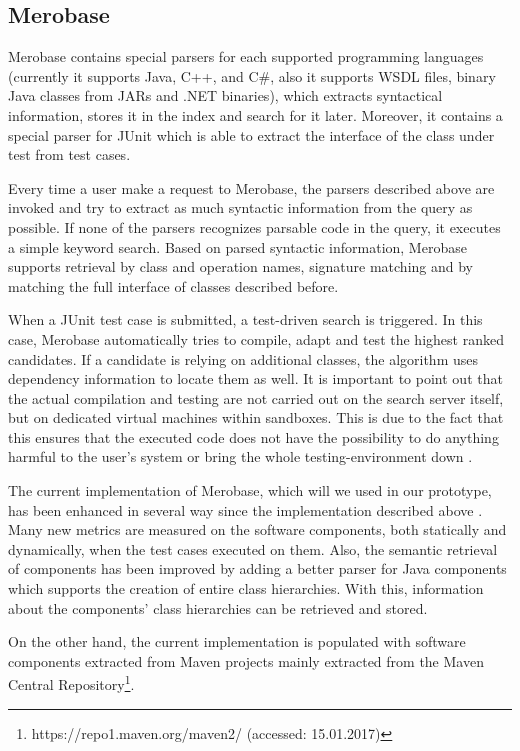 \subsection{Merobase}
\label{subsec:merobase}

Merobase contains special parsers for each supported programming languages (currently it supports Java, C++, and C\#, also it supports WSDL files, binary Java classes from JARs and .NET binaries), which extracts syntactical information, stores it in the index and search for it later. Moreover, it contains a special parser for JUnit which is able to extract the interface of the class under test from test cases.

Every time a user make a request to Merobase, the parsers described above are invoked and try to extract as much syntactic information from the query as possible. If none of the parsers recognizes parsable code in the query, it executes a simple keyword search. Based on parsed syntactic information, Merobase supports retrieval by class and operation names, signature matching and by matching the full interface of classes described before.

When a JUnit test case is submitted, a test-driven search is triggered. In this case, Merobase automatically tries to compile, adapt and test the highest ranked candidates. If a candidate is relying on additional classes, the algorithm uses dependency information to locate them as well. It is important to point out that the actual compilation and testing are not carried out on the search server itself, but on dedicated virtual machines within sandboxes. This is due to the fact that this ensures that the executed code does not have the possibility to do anything harmful to the user's system or bring the whole testing-environment down \citep{Hummel2013}.

The current implementation of Merobase, which will we used in our prototype, has been enhanced in several way since the implementation described above \citep{Kessel2016}. Many new metrics are measured on the software components, both statically and dynamically, when the test cases executed on them. Also, the semantic retrieval of components has been improved by adding a better parser for Java components which supports the creation of entire class hierarchies. With this, information about the components' class hierarchies can be retrieved and stored.

On the other hand, the current implementation is populated with software components extracted from Maven projects mainly extracted from the Maven Central Repository\footnote{https://repo1.maven.org/maven2/ (accessed: 15.01.2017)}. 

